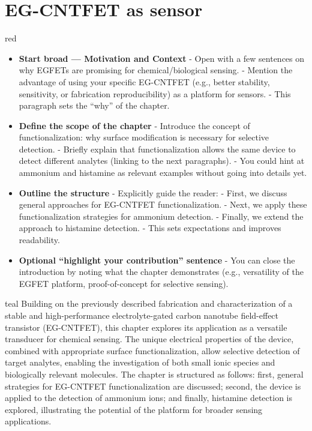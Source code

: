 \chapter{EG-CNTFET as sensor}
\label{cap:chapter4}

\begin{color}{red}
\begin{itemize}
    \item \textbf{Start broad — Motivation and Context}  
    - Open with a few sentences on why EGFETs are promising for chemical/biological sensing.  
    - Mention the advantage of using your specific EG-CNTFET (e.g., better stability, sensitivity, or fabrication reproducibility) as a platform for sensors.  
    - This paragraph sets the “why” of the chapter.  

    \item \textbf{Define the scope of the chapter}  
    - Introduce the concept of functionalization: why surface modification is necessary for selective detection.  
    - Briefly explain that functionalization allows the same device to detect different analytes (linking to the next paragraphs).  
    - You could hint at ammonium and histamine as relevant examples without going into details yet.  

    \item \textbf{Outline the structure}  
    - Explicitly guide the reader:  
      - First, we discuss general approaches for EG-CNTFET functionalization.  
      - Next, we apply these functionalization strategies for ammonium detection.  
      - Finally, we extend the approach to histamine detection.  
    - This sets expectations and improves readability.  

    \item \textbf{Optional “highlight your contribution” sentence}  
    - You can close the introduction by noting what the chapter demonstrates (e.g., versatility of the EGFET platform, proof-of-concept for selective sensing).  
\end{itemize}

\end{color}

\begin{color}{teal}
Building on the previously described fabrication and characterization of a stable and high-performance electrolyte-gated carbon nanotube field-effect transistor (EG-CNTFET), this chapter explores its application as a versatile transducer for chemical sensing. The unique electrical properties of the device, combined with appropriate surface functionalization, allow selective detection of target analytes, enabling the investigation of both small ionic species and biologically relevant molecules. The chapter is structured as follows: first, general strategies for EG-CNTFET functionalization are discussed; second, the device is applied to the detection of ammonium ions; and finally, histamine detection is explored, illustrating the potential of the platform for broader sensing applications.
\end{color}


